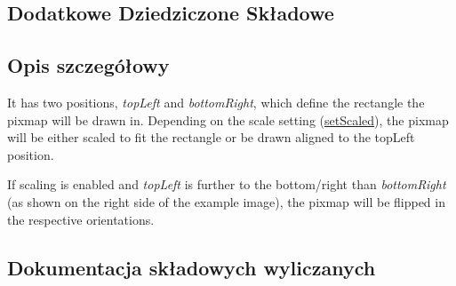\subsection*{Dodatkowe Dziedziczone Składowe}


\subsection{Opis szczegółowy}
 It has two positions, {\itshape top\+Left} and {\itshape bottom\+Right}, which define the rectangle the pixmap will be drawn in. Depending on the scale setting (\hyperlink{class_q_c_p_item_pixmap_ab4d44529a1c6c8d37d0ea7560e042777}{set\+Scaled}), the pixmap will be either scaled to fit the rectangle or be drawn aligned to the top\+Left position.

If scaling is enabled and {\itshape top\+Left} is further to the bottom/right than {\itshape bottom\+Right} (as shown on the right side of the example image), the pixmap will be flipped in the respective orientations. 

\subsection{Dokumentacja składowych wyliczanych}
